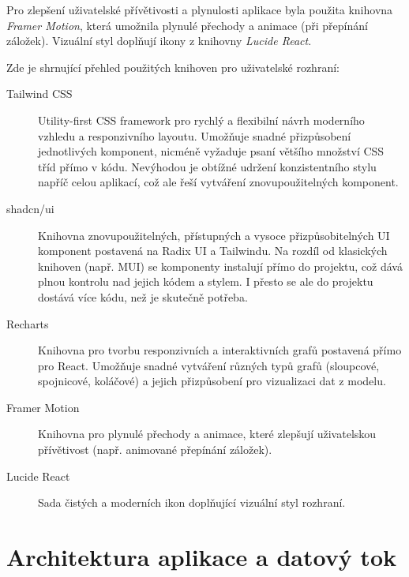 Pro zlepšení uživatelské přívětivosti a plynulosti aplikace byla použita knihovna \textit{Framer Motion}, která umožnila plynulé přechody a animace (při přepínání záložek). Vizuální styl doplňují ikony z knihovny \textit{Lucide React}.

Zde je shrnující přehled použitých knihoven pro uživatelské rozhraní:

\begin{description}
	
	\item[Tailwind CSS] Utility-first CSS framework pro rychlý a flexibilní návrh moderního vzhledu a responzivního layoutu. Umožňuje snadné přizpůsobení jednotlivých komponent, nicméně vyžaduje psaní většího množství CSS tříd přímo v kódu. Nevýhodou je obtížné udržení konzistentního stylu napříč celou aplikací, což ale řeší vytváření znovupoužitelných komponent.
	
	\item[shadcn/ui] Knihovna znovupoužitelných, přístupných a vysoce přizpůsobitelných UI komponent postavená na Radix UI a Tailwindu. Na rozdíl od klasických knihoven (např. MUI) se komponenty instalují přímo do projektu, což dává plnou kontrolu nad jejich kódem a stylem. I přesto se ale do projektu dostává více kódu, než je skutečně potřeba.
	
	\item[Recharts] Knihovna pro tvorbu responzivních a interaktivních grafů postavená přímo pro React. Umožňuje snadné vytváření různých typů grafů (sloupcové, spojnicové, koláčové) a jejich přizpůsobení pro vizualizaci dat z modelu.
	
	\item[Framer Motion] Knihovna pro plynulé přechody a animace, které zlepšují uživatelskou přívětivost (např. animované přepínání záložek).
	
	\item[Lucide React] Sada čistých a moderních ikon doplňující vizuální styl rozhraní.

\end{description}

\section{Architektura aplikace a datový tok}
\label{sec:app_architektura}


